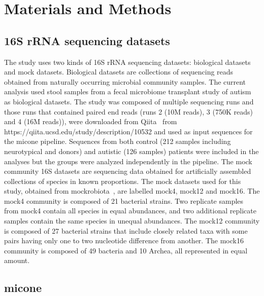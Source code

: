 
\section*{Materials and Methods}

  \subsection*{16S rRNA sequencing datasets}

  \vspace{-5mm}
    The study uses two kinds of 16S rRNA sequencing datasets: biological datasets and mock datasets.
    Biological datasets are collections of sequencing reads obtained from naturally occurring microbial community samples.
    The current analysis used stool samples from a fecal microbiome transplant study of autism~\cite{Kang2017} as biological datasets.
    The study was composed of multiple sequencing runs and those runs that contained paired end reads (runs 2 (10M reads), 3 (750K reads) and 4 (16M reads)), were downloaded from Qiita~\cite{qiita} from https://qiita.ucsd.edu/study/description/10532 and used as input sequences for the \ac{micone} pipeline.
    Sequences from both control (212 samples including neurotypical and donors) and autistic (126 samples) patients were included in the analyses but the groups were analyzed independently in the pipeline.
    The mock community 16S datasets are sequencing data obtained for artificially assembled collections of species in known proportions.
    The mock datasets used for this study, obtained from mockrobiota~\cite{Bokulich2016}, are labelled mock4, mock12 and mock16.
    The mock4 community is composed of 21 bacterial strains.
    Two replicate samples from mock4 contain all species in equal abundances, and two additional replicate samples contain the same species in unequal abundances.
    The mock12 community is composed of 27 bacterial strains that include closely related taxa with some pairs having only one to two nucleotide difference from another.
    The mock16 community is composed of 49 bacteria and 10 Archea, all represented in equal amount.

  \subsection*{\ac{micone}}

